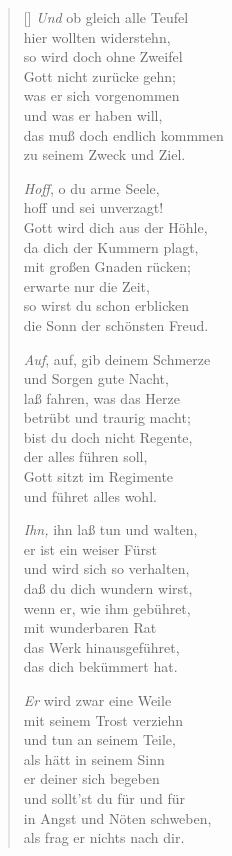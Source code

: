 \documentclass[fontsize=11pt]{scrartcl}
\begin{document}
\begin{multicols}{2}
\begin{verse}[\versewidth]
   \emph{Und} ob gleich alle Teufel\\
  hier wollten widerstehn,\\
  so wird doch ohne Zweifel\\
  Gott nicht zurücke gehn;\\
  was er sich vorgenommen\\
  und was er haben will,\\
  das muß doch endlich kommmen\\
  zu seinem Zweck und Ziel.

   \emph{Hoff}, o du arme Seele,\\
  hoff und sei unverzagt!\\
  Gott wird dich aus der Höhle,\\
  da dich der Kummern plagt,\\
  mit großen Gnaden rücken;\\
  erwarte nur die Zeit,\\
  so wirst du schon erblicken\\
  die Sonn der schönsten Freud.


   \emph{Auf}, auf, gib deinem Schmerze\\
  und Sorgen gute Nacht,\\
  laß fahren, was das Herze\\
  betrübt und traurig macht;\\
  bist du doch nicht Regente,\\
  der alles führen soll,\\
  Gott sitzt im Regimente\\
  und führet alles wohl.

   \emph{Ihn,} ihn laß tun und walten,\\
  er ist ein weiser Fürst\\
  und wird sich so verhalten,\\
  daß du dich wundern wirst,\\
  wenn er, wie ihm gebühret,\\
  mit wunderbaren Rat\\
  das Werk hinausgeführet,\\
  das dich bekümmert hat.

   \emph{Er} wird zwar eine Weile\\
  mit seinem Trost verziehn\\
  und tun an seinem Teile,\\
  als hätt in seinem Sinn\\
  er deiner sich begeben\\
  und sollt'st du für und für\\
  in Angst und Nöten schweben,\\
  als frag er nichts nach dir.


\end{verse}
\end{multicols}
\end{document}

